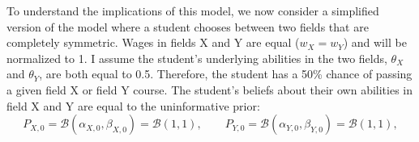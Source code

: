 \documentclass[10 pt]{article}
\newcommand{\toedit}[1]{{\color{gray}#1}}
\newcommand{\toedit}[1]{#1}
\begin{document}
\toedit{To understand the implications of this model, we now consider a simplified version of the model where a student chooses between two fields that are completely symmetric.}
Wages in fields X and Y are equal ($w_X = w_Y$) and will be normalized to 1. 
I assume the student's underlying abilities in the two fields, $\theta_X$ and $\theta_Y$, are both equal to 0.5. Therefore, the student has a 50\% chance of passing a given field X or field Y course.{}
The student's beliefs about their own abilities in field X and Y are equal to the uninformative prior: 
\begin{equation*}
    P_{X,0} = \mathcal{B}(\alpha_{X, 0}, \beta_{X, 0}) = \mathcal{B} (1, 1), 
    \quad \quad 
    P_{Y,0} = \mathcal{B}(\alpha_{Y, 0}, \beta_{Y, 0}) = \mathcal{B} (1, 1), 
\end{equation*}

\begin{figure}[ht!]
\centering

\end{figure}


\printbibliography
\end{document}
